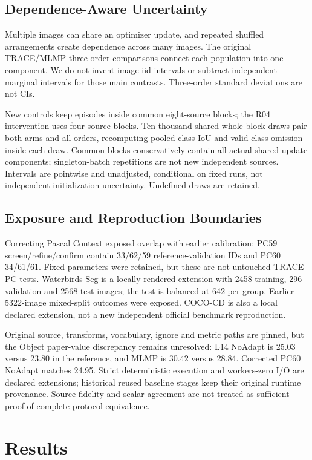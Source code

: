 \documentclass[10pt,twocolumn]{article}
\begin{document}
\subsection{Dependence-Aware Uncertainty}
Multiple images can share an optimizer update, and repeated shuffled
arrangements create dependence across many images. The original TRACE/MLMP
three-order comparisons connect each population into one component. We do
not invent image-iid intervals or subtract independent marginal intervals
for those main contrasts. Three-order standard deviations are not CIs.

New controls keep episodes inside common eight-source blocks; the R04
intervention uses four-source blocks. Ten thousand shared whole-block draws
pair both arms and all orders, recomputing pooled class IoU and valid-class
omission inside each draw. Common blocks conservatively contain all actual
shared-update components; singleton-batch repetitions are not new independent
sources. Intervals are pointwise and unadjusted, conditional on fixed runs,
not independent-initialization uncertainty. Undefined draws are retained.

\subsection{Exposure and Reproduction Boundaries}
Correcting Pascal Context exposed overlap with earlier calibration:
PC59 screen/refine/confirm contain 33/62/59 reference-validation IDs and PC60
34/61/61. Fixed parameters were retained, but these are not untouched TRACE
PC tests. Waterbirds-Seg is a locally rendered extension with 2458 training,
296 validation and 2568 test images; the test is balanced at 642 per group.
Earlier 5322-image mixed-split outcomes were exposed. COCO-CD is also a local
declared extension, not a new independent official benchmark reproduction.

Original source, transforms, vocabulary, ignore and metric paths are pinned,
but the Object paper-value discrepancy remains unresolved: L14 NoAdapt is
25.03 versus 23.80 in the reference, and MLMP is 30.42 versus 28.84. Corrected
PC60 NoAdapt matches 24.95. Strict deterministic execution and workers-zero
I/O are declared extensions; historical reused baseline stages keep their
original runtime provenance. Source fidelity and scalar agreement are not
treated as sufficient proof of complete protocol equivalence.

\section{Results}
\end{document}

